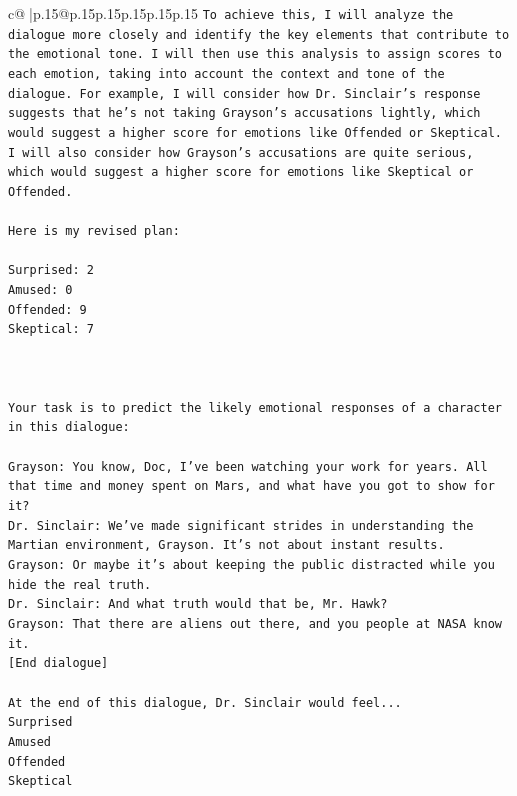 \documentclass{article}
\begin{document}
{\begin{supertabular}{c@{$\;$}|p{.15\linewidth}@{}p{.15\linewidth}p{.15\linewidth}p{.15\linewidth}p{.15\linewidth}p{.15\linewidth}}
{{{\texttt{To achieve this, I will analyze the dialogue more closely and identify the key elements that contribute to the emotional tone. I will then use this analysis to assign scores to each emotion, taking into account the context and tone of the dialogue. For example, I will consider how Dr. Sinclair's response suggests that he's not taking Grayson's accusations lightly, which would suggest a higher score for emotions like Offended or Skeptical. I will also consider how Grayson's accusations are quite serious, which would suggest a higher score for emotions like Skeptical or Offended.} \\
\\ 
\texttt{Here is my revised plan:} \\
\\ 
\texttt{Surprised: 2} \\
\texttt{Amused: 0} \\
\texttt{Offended: 9} \\
\texttt{Skeptical: 7} \\
\\ 
\\ 
\\ 
\texttt{Your task is to predict the likely emotional responses of a character in this dialogue:} \\
\\ 
\texttt{Grayson: You know, Doc, I've been watching your work for years. All that time and money spent on Mars, and what have you got to show for it? } \\
\texttt{Dr. Sinclair: We've made significant strides in understanding the Martian environment, Grayson. It's not about instant results. } \\
\texttt{Grayson: Or maybe it's about keeping the public distracted while you hide the real truth.} \\
\texttt{Dr. Sinclair: And what truth would that be, Mr. Hawk?} \\
\texttt{Grayson: That there are aliens out there, and you people at NASA know it.} \\
\texttt{{[}End dialogue{]}} \\
\\ 
\texttt{At the end of this dialogue, Dr. Sinclair would feel...} \\
\texttt{Surprised} \\
\texttt{Amused} \\
\texttt{Offended} \\
\texttt{Skeptical} \\
\\ 
}}}
\end{supertabular}}
\end{document}

